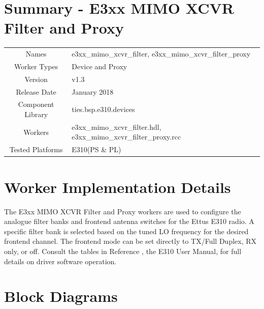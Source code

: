 \documentclass{article}
\author{} %
\date{Version \docVersion} %
\title{\docTitle}
\def\docVersion{1.3}
\def\comp{e3xx\_mimo\_xcvr\_filter}
\def\proxy{e3xx\_mimo\_xcvr\_filter\_proxy}
\def\Comp{E3xx MIMO XCVR Filter and Proxy }
\begin{document}
\section*{Summary - \Comp}
\begin{tabular}{|c|M{13.5cm}|}
	\hline
	                  &                                      \\
	\hline
	Names              & \comp, \proxy                        \\
	\hline
	Worker Types       & Device and Proxy \\
	\hline
	Version           & v\docVersion \\
	\hline
	Release Date      & January 2018 \\
	\hline
	Component Library & ties.bsp.e310.devices   \\
	\hline
	Workers           & \comp.hdl, \proxy.rcc                \\
	\hline
	Tested Platforms  & E310(PS \& PL)                       \\
	\hline
\end{tabular}

\section*{Worker Implementation Details}
The \Comp workers are used to configure the analogue filter banks and frontend antenna switches for the Ettus E310 radio. A specific filter bank is selected based on the tuned LO frequency for the desired frontend channel. The frontend mode can be set directly to TX/Full Duplex, RX only, or off. Consult the tables in Reference \cite{usermanual}, the E310 User Manual, for full details on driver software operation.
\section*{Block Diagrams}
\end{document}
